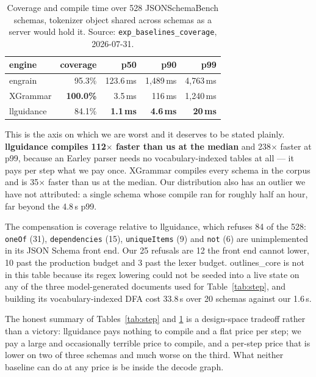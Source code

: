 \documentclass{article}
\begin{document}
\begin{table}[t]
\caption{Coverage and compile time over 528 JSONSchemaBench schemas, tokenizer
object shared across schemas as a server would hold it.
Source: \texttt{exp\_baselines\_coverage}, 2026-07-31.}
\label{tab:coverage}
\vskip 0.1in
\begin{center}
\begin{small}
\begin{tabular}{lrrrr}
\toprule
engine & coverage & p50 & p90 & p99 \\
\midrule
engrain    & 95.3\% & 123.6\,ms & 1{,}489\,ms & 4{,}763\,ms \\
XGrammar   & \textbf{100.0\%} & 3.5\,ms & 116\,ms & 1{,}240\,ms \\
llguidance & 84.1\% & \textbf{1.1\,ms} & \textbf{4.6\,ms} & \textbf{20\,ms} \\
\bottomrule
\end{tabular}
\end{small}
\end{center}
\vskip -0.1in
\end{table}

This is the axis on which we are worst and it deserves to be stated plainly.
\textbf{llguidance compiles 112$\times$ faster than us at the median} and
238$\times$ faster at p99, because an Earley parser needs no vocabulary-indexed
tables at all --- it pays per step what we pay once. XGrammar compiles every
schema in the corpus and is 35$\times$ faster than us at the median. Our
distribution also has an outlier we have not attributed: a single schema whose
compile ran for roughly half an hour, far beyond the 4.8\,s p99.

The compensation is coverage relative to llguidance, which refuses 84 of the
528: \texttt{oneOf} (31), \texttt{dependencies} (15), \texttt{uniqueItems} (9)
and \texttt{not} (6) are unimplemented in its JSON Schema front end. Our 25
refusals are 12 the front end cannot lower, 10 past the production budget and
3 past the lexer budget. outlines\_core is not in this table because its
regex lowering could not be seeded into a live state on any of the three
model-generated documents used for Table~\ref{tab:step}, and building its
vocabulary-indexed DFA cost 33.8\,s over 20 schemas against our 1.6\,s.

The honest summary of Tables~\ref{tab:step} and \ref{tab:coverage} is a
design-space tradeoff rather than a victory: llguidance pays nothing to compile
and a flat price per step; we pay a large and occasionally terrible price to
compile, and a per-step price that is lower on two of three schemas and much
worse on the third. What neither baseline can do at any price is be inside the
decode graph.
\end{document}
